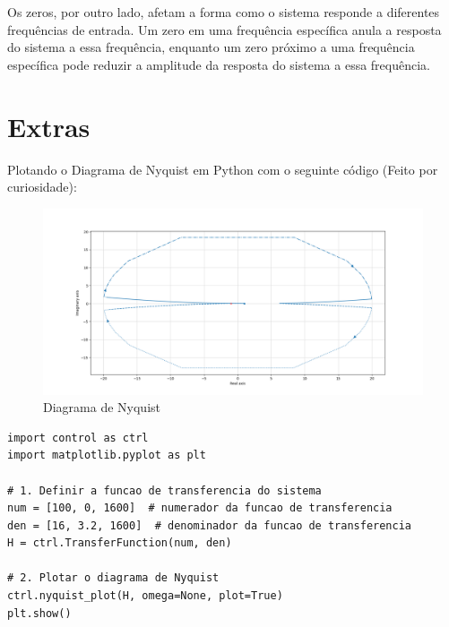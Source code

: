 \documentclass[10pt]{article}
\begin{document}
\quad Os zeros, por outro lado, afetam a forma como o sistema responde a diferentes frequências de entrada.
Um zero em uma frequência específica anula a resposta do sistema a essa frequência,
enquanto um zero próximo a uma frequência específica pode reduzir a amplitude da resposta do sistema a essa frequência.

\newpage

\section{Extras}

\quad Plotando o Diagrama de Nyquist em Python com o seguinte código (Feito por curiosidade):

\begin{figure}[h]
    \centering
    \includegraphics[scale=0.45]{nyquist.png}
    \caption{Diagrama de Nyquist}
\end{figure}

\begin{lstlisting}
import control as ctrl
import matplotlib.pyplot as plt

# 1. Definir a funcao de transferencia do sistema
num = [100, 0, 1600]  # numerador da funcao de transferencia
den = [16, 3.2, 1600]  # denominador da funcao de transferencia
H = ctrl.TransferFunction(num, den)

# 2. Plotar o diagrama de Nyquist
ctrl.nyquist_plot(H, omega=None, plot=True)
plt.show()
\end{lstlisting}
\end{document}

